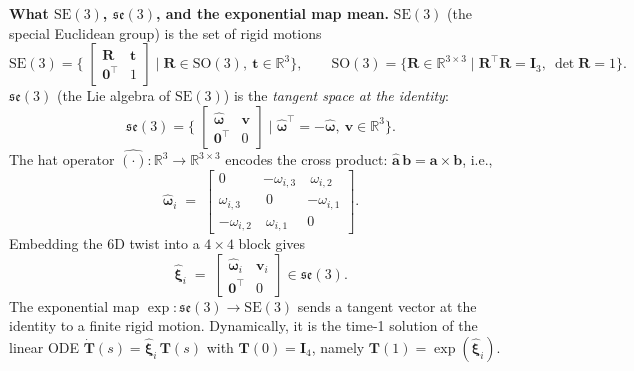 \begin{enrichment}
\begin{enrichment}
        \textbf{What \(\mathrm{SE}(3)\), \(\mathfrak{se}(3)\), and the exponential map mean.}
        \(\mathrm{SE}(3)\) (the special Euclidean group) is the set of rigid motions
        \[
        \mathrm{SE}(3)=\Big\{\;
        \begin{bmatrix}\mathbf{R}&\mathbf{t}\\ \mathbf{0}^\top&1\end{bmatrix}
        \;\Big|\; \mathbf{R}\in\mathrm{SO}(3),\ \mathbf{t}\in\mathbb{R}^3
        \Big\},
        \qquad
        \mathrm{SO}(3)=\{\mathbf{R}\in\mathbb{R}^{3\times 3}\mid \mathbf{R}^\top\mathbf{R}=\mathbf{I}_3,\ \det\mathbf{R}=1\}.
        \]
        \(\mathfrak{se}(3)\) (the Lie algebra of \(\mathrm{SE}(3)\)) is the \emph{tangent space at the identity}:
        \[
        \mathfrak{se}(3)=\Big\{\;
        \begin{bmatrix}\widehat{\boldsymbol{\omega}}&\mathbf{v}\\ \mathbf{0}^\top&0\end{bmatrix}
        \;\Big|\; \widehat{\boldsymbol{\omega}}^\top=-\widehat{\boldsymbol{\omega}},\ \mathbf{v}\in\mathbb{R}^3
        \Big\}.
        \]
        The hat operator \(\widehat{(\cdot)}:\mathbb{R}^3\!\to\!\mathbb{R}^{3\times 3}\) encodes the cross product:
        \(\widehat{\mathbf{a}}\,\mathbf{b}=\mathbf{a}\times\mathbf{b}\), i.e.,
        \[
        \widehat{\boldsymbol{\omega}}_i \;=\;
        \begin{bmatrix}
            0 & -\omega_{i,3} & \ \omega_{i,2}\\
            \omega_{i,3} & \ 0 & -\omega_{i,1}\\
            -\omega_{i,2} & \ \omega_{i,1} & 0
        \end{bmatrix}.
        \]
        Embedding the 6D twist into a \(4\times 4\) block gives
        \[
        \widehat{\boldsymbol{\xi}}_i \;=\;
        \begin{bmatrix}
            \widehat{\boldsymbol{\omega}}_i & \mathbf{v}_i\\
            \mathbf{0}^\top & 0
        \end{bmatrix}\in\mathfrak{se}(3).
        \]
        The exponential map \(\exp:\mathfrak{se}(3)\!\to\!\mathrm{SE}(3)\) sends a tangent vector at the identity to a finite rigid motion. Dynamically, it is the time-1 solution of the linear ODE \(\dot{\mathbf{T}}(s)=\widehat{\boldsymbol{\xi}}_i\,\mathbf{T}(s)\) with \(\mathbf{T}(0)=\mathbf{I}_4\), namely \(\mathbf{T}(1)=\exp(\widehat{\boldsymbol{\xi}}_i)\).
        

\end{enrichment}
\end{enrichment}
